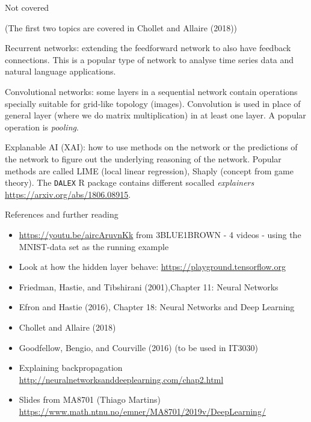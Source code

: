 \documentclass[10pt,ignorenonframetext,]{beamer}
\providecommand{\tightlist}{%
  \setlength{\itemsep}{0pt}\setlength{\parskip}{0pt}}
\begin{document}
\begin{frame}[fragile]

\begin{block}{Not covered}

(The first two topics are covered in Chollet and Allaire (2018))

Recurrent networks: extending the feedforward network to also have
feedback connections. This is a popular type of network to analyse time
series data and natural language applications.

Convolutional networks: some layers in a sequential network contain
operations specially suitable for grid-like topology (images).
Convolution is used in place of general layer (where we do matrix
multiplication) in at least one layer. A popular operation is
\emph{pooling}.

Explanable AI (XAI): how to use methods on the network or the
predictions of the network to figure out the underlying reasoning of the
network. Popular methods are called LIME (local linear regression),
Shaply (concept from game theory). The \texttt{DALEX} R package contains
different socalled \emph{explainers}
\url{https://arxiv.org/abs/1806.08915}.

\end{block}

\end{frame}

\begin{frame}{References and further reading}

\begin{itemize}
\tightlist
\item
  \url{https://youtu.be/aircAruvnKk} from 3BLUE1BROWN - 4 videos - using
  the MNIST-data set as the running example
\item
  Look at how the hidden layer behave:
  \url{https://playground.tensorflow.org}
\item
  Friedman, Hastie, and Tibshirani (2001),Chapter 11: Neural Networks
\item
  Efron and Hastie (2016), Chapter 18: Neural Networks and Deep Learning
\item
  Chollet and Allaire (2018)
\item
  Goodfellow, Bengio, and Courville (2016) (to be used in IT3030)
\item
  Explaining backpropagation
  \url{http://neuralnetworksanddeeplearning.com/chap2.html}
\item
  Slides from MA8701 (Thiago Martins)
  \url{https://www.math.ntnu.no/emner/MA8701/2019v/DeepLearning/}
\end{itemize}

\end{frame}
\end{document}

